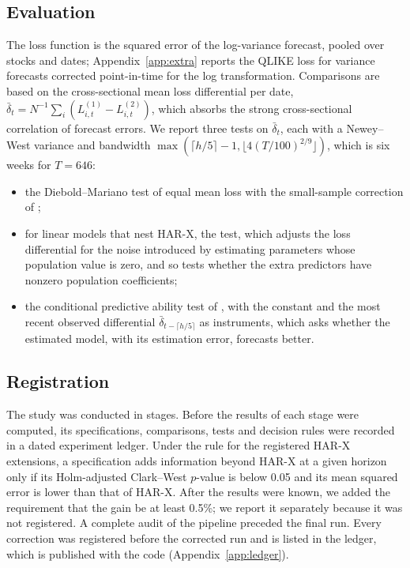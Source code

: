 \subsection{Evaluation}

The loss function is the squared error of the log-variance forecast, pooled
over stocks and dates; Appendix~\ref{app:extra} reports the QLIKE loss for
variance forecasts corrected point-in-time for the log transformation.
Comparisons are based on the cross-sectional mean loss differential per date,
$\bar\delta_t = N^{-1}\sum_i (L^{(1)}_{i,t} - L^{(2)}_{i,t})$, which absorbs
the strong cross-sectional correlation of forecast errors. We report three
tests on $\bar\delta_t$, each with a Newey--West variance and bandwidth
$\max(\lceil h/5\rceil - 1, \lfloor 4(T/100)^{2/9}\rfloor)$, which is six
weeks for $T=646$:

\begin{itemize}
\item the Diebold--Mariano test of equal mean loss
\citep{diebold1995comparing} with the small-sample correction of
\citet{harvey1997testing};
\item for linear models that nest HAR-X, the \citet{clark2007approximately}
test, which adjusts the loss differential for the noise introduced by
estimating parameters whose population value is zero, and so tests whether
the extra predictors have nonzero population coefficients;
\item the conditional predictive ability test of \citet{giacomini2006tests},
with the constant and the most recent observed differential
$\bar\delta_{t-\lceil h/5\rceil}$ as instruments, which asks whether the
estimated model, with its estimation error, forecasts better.
\end{itemize}

\subsection{Registration}

The study was conducted in stages. Before the results of each stage were
computed, its specifications, comparisons, tests and decision rules were
recorded in a dated experiment ledger. Under the rule for the registered
HAR-X extensions, a specification adds information beyond HAR-X at a given
horizon only if its Holm-adjusted \citep{holm1979simple} Clark--West
$p$-value is below 0.05 and its mean squared error is lower than that of
HAR-X. After the results were known, we added the requirement that the gain
be at least 0.5\%; we report it separately because it was not registered. A
complete audit of the pipeline preceded the final run. Every correction was
registered before the corrected run and is listed in the ledger, which is
published with the code (Appendix~\ref{app:ledger}).
